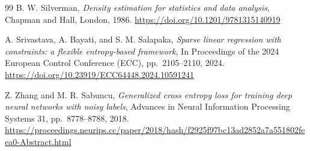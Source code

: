 \documentclass[pdflatex,sn-mathphys-num]{sn-jnl}%
\theoremstyle{thmstyleone}%
\theoremstyle{thmstyletwo}%
\theoremstyle{thmstylethree}%
\begin{document}
\begin{thebibliography}{99}
{\sc B. W. Silverman},
{\em Density estimation for statistics and data analysis}, Chapman and Hall, London, 1986.
\url{https://doi.org/10.1201/9781315140919}


{\sc A. Srivastava, A. Bayati, and S. M. Salapaka},
{\em Sparse linear regression with constraints: a flexible entropy-based framework}, In Proceedings of the 2024 European Control Conference (ECC), pp.~2105--2110, 2024.
\url{https://doi.org/10.23919/ECC64448.2024.10591241}

{\sc Z. Zhang and M. R. Sabuncu},
{\em Generalized cross entropy loss for training deep neural networks with noisy labels},
Advances in Neural Information Processing Systems 31, pp.~8778--8788, 2018.
\url{https://proceedings.neurips.cc/paper/2018/hash/f2925f97bc13ad2852a7a551802feea0-Abstract.html}



\end{thebibliography}


\end{document}
